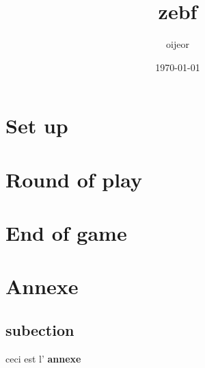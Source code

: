 \documentclass{article}%
\title{zebf}%
\author{oijeor}%
\date{\today}%
\begin{document}
%
\pagestyle{empty}%
\normalsize%
\maketitle%
\section{ Set up
}%
\label{sec:Setup}%

%
\section{ Round of play
}%
\label{sec:Roundofplay}%

%
\section{ End of game
}%
\label{sec:Endofgame}%

%
\section{ Annexe
}%
\label{sec:Annexe}%

%
\subsection{ subection
}%
\label{subsec:subection}%
ceci est l'%
\textbf{annexe}

%
\end{document}
